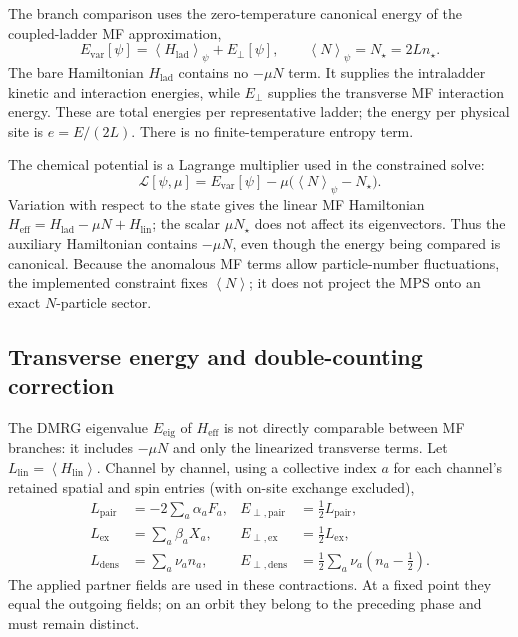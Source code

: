 \documentclass[11pt]{article}
\newcommand{\Hlad}{H_{\mathrm{lad}}}
\newcommand{\Heff}{H_{\mathrm{eff}}}
\newcommand{\mean}[1]{\left\langle #1\right\rangle}
\begin{document}
The branch comparison uses the zero-temperature canonical energy of the
coupled-ladder MF approximation,
\begin{equation}
 E_{\mathrm{var}}[\psi]=\mean{\Hlad}_\psi+E_\perp[\psi],
 \qquad \mean N_\psi=N_\star=2L n_\star.
\label{eq:canonical-constraint}
\end{equation}
The bare Hamiltonian \(\Hlad\) contains no \(-\mu N\) term.  It supplies the
intraladder kinetic and interaction energies, while \(E_\perp\) supplies the
transverse MF interaction energy.  These are total energies per representative
ladder; the energy per physical site is \(e=E/(2L)\).  There is no
finite-temperature entropy term.

The chemical potential is a Lagrange multiplier used in the constrained solve:
\begin{equation}
 \mathcal L[\psi,\mu]
 =E_{\mathrm{var}}[\psi]-\mu\bigl(\mean N_\psi-N_\star\bigr).
\end{equation}
Variation with respect to the state gives the linear MF Hamiltonian
\(\Heff=\Hlad-\mu N+H_{\mathrm{lin}}\); the scalar \(\mu N_\star\) does
not affect its eigenvectors.  Thus the auxiliary Hamiltonian contains
\(-\mu N\), even though the energy being compared is canonical.  Because
the anomalous MF terms allow particle-number fluctuations, the implemented
constraint fixes \(\mean N\); it does not project the MPS onto an exact
\(N\)-particle sector.

\subsection{Transverse energy and double-counting correction}

The DMRG eigenvalue \(E_{\mathrm{eig}}\) of \(\Heff\) is not directly
comparable between MF branches: it includes \(-\mu N\) and only the linearized
transverse terms.  Let \(L_{\mathrm{lin}}=\mean{H_{\mathrm{lin}}}\).  Channel
by channel, using a collective index \(a\) for each channel's retained
spatial and spin entries (with on-site exchange excluded),
\begin{align}
 L_{\mathrm{pair}}&=-2\sum_a\alpha_a F_a,
 &E_{\perp,\mathrm{pair}}&=\tfrac12L_{\mathrm{pair}},\\
 L_{\mathrm{ex}}&=\sum_a\beta_a X_a,
 &E_{\perp,\mathrm{ex}}&=\tfrac12L_{\mathrm{ex}},\\
 L_{\mathrm{dens}}&=\sum_a\nu_a n_a,
 &E_{\perp,\mathrm{dens}}&=\tfrac12\sum_a\nu_a(n_a-\tfrac12).
\end{align}
The applied partner fields are used in these contractions.  At a fixed point
they equal the outgoing fields; on an orbit they belong to the preceding
phase and must remain distinct.
\end{document}
